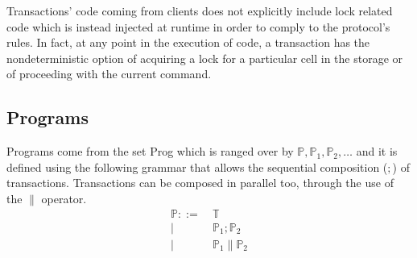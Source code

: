 Transactions' code coming from clients does not explicitly include lock related code which is instead injected at runtime in order to comply to the protocol's rules. In fact, at any point in the execution of code, a transaction has the nondeterministic option of acquiring a lock for a particular cell in the storage or of proceeding with the current command.

\subsection{Programs}

Programs come from the set \textsf{Prog} which is ranged over by $\mathds{P}, \mathds{P}_1, \mathds{P}_2, \ldots$ and it is defined using the following grammar that allows the sequential composition ($;$) of transactions. Transactions can be composed in parallel too, through the use of the $\|$ operator.
\begin{align*}
\mathds{P} ::=&
\ \mathds{T} \\
|&\ \mathds{P}_1; \mathds{P}_2 \\
|&\ \mathds{P}_1 \| \mathds{P}_2
\end{align*}

